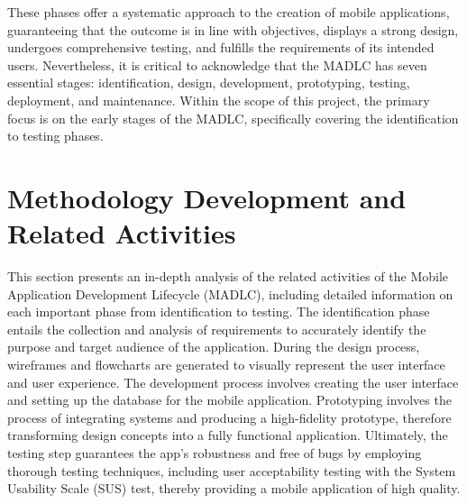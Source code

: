 These phases offer a systematic approach to the creation of mobile applications, guaranteeing that the outcome is in line with objectives, displays a strong design, undergoes comprehensive testing, and fulfills the requirements of its intended users. Nevertheless, it is critical to acknowledge that the MADLC has seven essential stages: identification, design, development, prototyping, testing, deployment, and maintenance. Within the scope of this project, the primary focus is on the early stages of the MADLC, specifically covering the identification to testing phases.
\pagebreak

\section{Methodology Development and Related Activities}
This section presents an in-depth analysis of the related activities of the Mobile Application Development Lifecycle (MADLC), including detailed information on each important phase from identification to testing. The identification phase entails the collection and analysis of requirements to accurately identify the purpose and target audience of the application. During the design process, wireframes and flowcharts are generated to visually represent the user interface and user experience. The development process involves creating the user interface and setting up the database for the mobile application. Prototyping involves the process of integrating systems and producing a high-fidelity prototype, therefore transforming design concepts into a fully functional application. Ultimately, the testing step guarantees the app's robustness and free of bugs by employing thorough testing techniques, including user acceptability testing with the System Usability Scale (SUS) test, thereby providing a mobile application of high quality.

